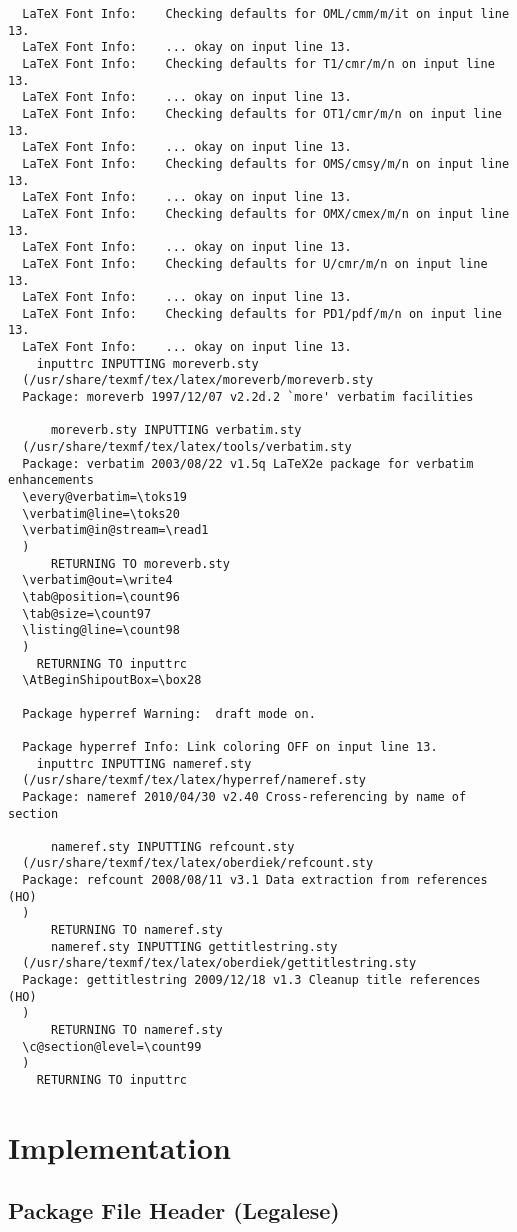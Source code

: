 \documentclass[fleqn]{article}%
\begin{document}
\begin{verbatim}
  LaTeX Font Info:    Checking defaults for OML/cmm/m/it on input line 13.
  LaTeX Font Info:    ... okay on input line 13.
  LaTeX Font Info:    Checking defaults for T1/cmr/m/n on input line 13.
  LaTeX Font Info:    ... okay on input line 13.
  LaTeX Font Info:    Checking defaults for OT1/cmr/m/n on input line 13.
  LaTeX Font Info:    ... okay on input line 13.
  LaTeX Font Info:    Checking defaults for OMS/cmsy/m/n on input line 13.
  LaTeX Font Info:    ... okay on input line 13.
  LaTeX Font Info:    Checking defaults for OMX/cmex/m/n on input line 13.
  LaTeX Font Info:    ... okay on input line 13.
  LaTeX Font Info:    Checking defaults for U/cmr/m/n on input line 13.
  LaTeX Font Info:    ... okay on input line 13.
  LaTeX Font Info:    Checking defaults for PD1/pdf/m/n on input line 13.
  LaTeX Font Info:    ... okay on input line 13.
    inputtrc INPUTTING moreverb.sty 
  (/usr/share/texmf/tex/latex/moreverb/moreverb.sty
  Package: moreverb 1997/12/07 v2.2d.2 `more' verbatim facilities
  
      moreverb.sty INPUTTING verbatim.sty 
  (/usr/share/texmf/tex/latex/tools/verbatim.sty
  Package: verbatim 2003/08/22 v1.5q LaTeX2e package for verbatim enhancements
  \every@verbatim=\toks19
  \verbatim@line=\toks20
  \verbatim@in@stream=\read1
  )
      RETURNING TO moreverb.sty 
  \verbatim@out=\write4
  \tab@position=\count96
  \tab@size=\count97
  \listing@line=\count98
  )
    RETURNING TO inputtrc 
  \AtBeginShipoutBox=\box28
  
  Package hyperref Warning:  draft mode on.
  
  Package hyperref Info: Link coloring OFF on input line 13.
    inputtrc INPUTTING nameref.sty 
  (/usr/share/texmf/tex/latex/hyperref/nameref.sty
  Package: nameref 2010/04/30 v2.40 Cross-referencing by name of section
  
      nameref.sty INPUTTING refcount.sty 
  (/usr/share/texmf/tex/latex/oberdiek/refcount.sty
  Package: refcount 2008/08/11 v3.1 Data extraction from references (HO)
  )
      RETURNING TO nameref.sty 
      nameref.sty INPUTTING gettitlestring.sty 
  (/usr/share/texmf/tex/latex/oberdiek/gettitlestring.sty
  Package: gettitlestring 2009/12/18 v1.3 Cleanup title references (HO)
  )
      RETURNING TO nameref.sty 
  \c@section@level=\count99
  )
    RETURNING TO inputtrc 
  \end{verbatim}
\endgroup


\DontAddQuotes  %

\section{Implementation}
\subsection{Package File Header (Legalese)} %

\end{document}
